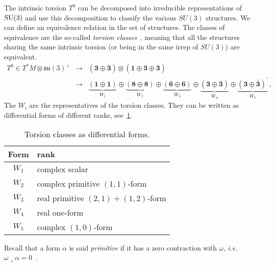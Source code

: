 \documentclass[debug]{phd}
\begin{document}
				The intrinsic torsion $T^0$ can be decomposed into irreducible representations of $\mathrm{SU}(3)$ and use this decomposition to classify the various $SU(3)$ structures.
				We can define an equivalence relation in the set of structures.
				The classes of equivalence are the so-called \emph{torsion classes}~\cite{TorsClass1, TorsClass2}, meaning that all the structures sharing the same intrinsic torsion (or being in the same irrep of $SU(3)$) are equivalent.
						\begin{equation*}
							\begin{array}{rrl}
								T^0 \in T^*M \otimes \mathfrak{su}(3)^{\perp}	& \rightarrow &	\left(\mathbf{3} \oplus \mathbf{\bar{3}}\right) \otimes  \left(\mathbf{1} \oplus \mathbf{3} \oplus \mathbf{\bar{3}}\right)	\\[1.5mm]
																	& \rightarrow &	\underbrace{\left(\mathbf{1} \oplus \mathbf{1} \right)}_{W_1} \oplus \underbrace{\left(\mathbf{8} \oplus \mathbf{8} \right)}_{W_2} \oplus \underbrace{\left(\mathbf{6} \oplus \mathbf{6} \right)}_{W_3} \oplus \underbrace{\left(\mathbf{3} \oplus \mathbf{\bar{3}} \right)}_{W_4} \oplus \underbrace{\left(\mathbf{3} \oplus \mathbf{\bar{3}} \right)^\prime}_{W_5} \, ,
							\end{array}
						\end{equation*}
				The $W_i$ are the representatives of the torsion classes. They can be written as differential forms of different ranks, see~\cref{tabW}.
						\begin{table}[h!]
						\centering
							\begin{tabular}{| c | l |}
								\toprule
								Form						&			rank								\\
								\hline
								$W_1$					& 			complex scalar						\\	
								$W_2 $	 				&			complex primitive $(1,1)$-form			\\	
								$W_3$		 			&			real primitive $(2,1) + (1,2)$-form		\\	
								$W_4$		 			&			real one-form						\\	
								$W_5$					&			complex $(1,0)$-form				\\
								\bottomrule
							\end{tabular}
							\caption{Torsion classes as differential forms.}
							\label{tabW}
						\end{table}
				
				Recall that a form $\alpha$ is said \emph{primitive} if it has a zero contraction with $\omega$, \emph{i.e.} $\omega\lrcorner \alpha = 0$~\cite{joyce}.
				
\end{document}
